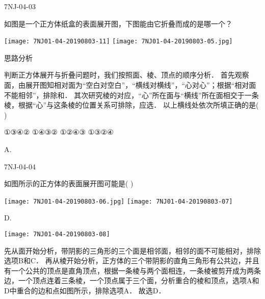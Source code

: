 \begin{defproblem}{7NJ-04-03}%
\begin{onlyproblem}%
如图是一个正方体纸盒的表面展开图，下图能由它折叠而成的是哪一个？ 
\begin{center}
\texttt{[image: 7NJ01-04-20190803-11]}
\texttt{[image: 7NJ01-04-20190803-05.jpg]}
\end{center}
思路分析 

判断正方体展开与折叠问题时，我们按照面、棱、顶点的顺序分析． 首先观察面，由展开图知相对面为“空白对空白”，“横线对横线”，“心对心”；根据“相对面不能相邻”，排除\underline{\hspace*{2cm}}和\underline{\hspace*{2cm}}． 其次研究棱的对应，“心”所在面与“横线”所在面相交于一条棱，根据“心”与这条棱的位置关系可排除\underline{\hspace*{2cm}}，应选\underline{\hspace*{2cm}}． 以上横线处依次所填正确的是(    ) 

\xx
{①③④②}
{①④③②}
{①②④③}
{①③②④}
\end{onlyproblem}%
\begin{onlysolution}%
\begin{solution}%
A.

\end{solution}%
\end{onlysolution}%
\end{defproblem}




\begin{defproblem}{7NJ-04-04}%
\begin{onlyproblem}%
如图所示的正方体的表面展开图可能是(    ) 
\begin{center}
\texttt{[image: 7NJ01-04-20190803-06.jpg]}
\texttt{[image: 7NJ01-04-20190803-07]}
\end{center}


\end{onlyproblem}%
\begin{onlysolution}%
\begin{solution}%
D.
\begin{center}
\texttt{[image: 7NJ01-04-20190803-08]}
\end{center}
先从面开始分析，带阴影的三角形的三个面是相邻面，相邻的面不可能相对，排除选项B和C． 再从棱开始分析，正方体的三个带阴影的直角三角形有公共边，并且有一个公共的顶点是直角顶点，根据一条棱与两个面相连，一条棱被剪开成为两条边，一个顶点连着三条棱，一个顶点属于三个面，分析重合的棱和顶点，选项A和D中重合的边和点如图所示，排除选项A．    故选D． 
\end{solution}%
\end{onlysolution}%
\end{defproblem}



